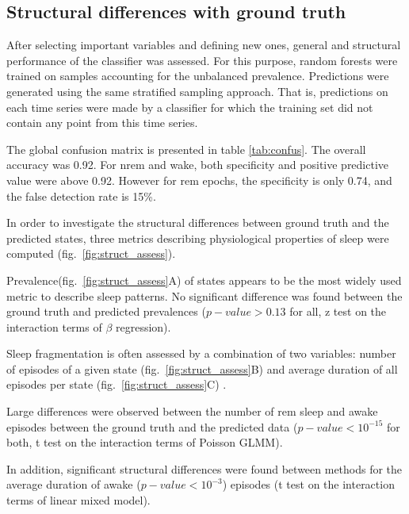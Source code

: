 


\subsection{Structural differences with ground truth}



After selecting important variables and defining new ones, general and structural performance of the classifier was assessed.
For this purpose, random forests were trained on samples accounting for the unbalanced prevalence.
Predictions were generated using the same stratified sampling approach.
That is, predictions on each time series were made by a classifier for which
the training set did not contain any point from this time series.




The global confusion matrix is presented in table \ref{tab:confus}. The overall accuracy was 0.92.
For \gls{nrem} and wake, both specificity and positive predictive value were above 0.92. However
for \gls{rem} epochs, the specificity is only 0.74, and the false detection rate is 15\%.

In order to investigate the structural differences between ground truth and the predicted states,
three metrics describing physiological properties of sleep were computed (fig.~\ref{fig:struct_assess}).

Prevalence(fig.~\ref{fig:struct_assess}A) of states appears to be the most widely used metric to describe sleep patterns\citationneeded{}.
No significant difference was found between the ground truth and predicted prevalences ($p-value > 0.13$ for all, z test on the interaction terms of $\beta$ regression).

Sleep fragmentation is often assessed by a combination of two variables: number of episodes of a given state (fig.~\ref{fig:struct_assess}B) and average duration of all episodes per state (fig.~\ref{fig:struct_assess}C) \citationneeded{}.

Large differences were observed between the number of \gls{rem} sleep and awake episodes between the ground truth and the predicted data
($p-value < 10^{-15}$ for both, t test on the interaction terms of Poisson GLMM).

In addition, significant structural differences were found between methods for the average duration of awake ($p-value < 10^{-3}$) episodes 
(t test on the interaction terms of linear mixed model). 

